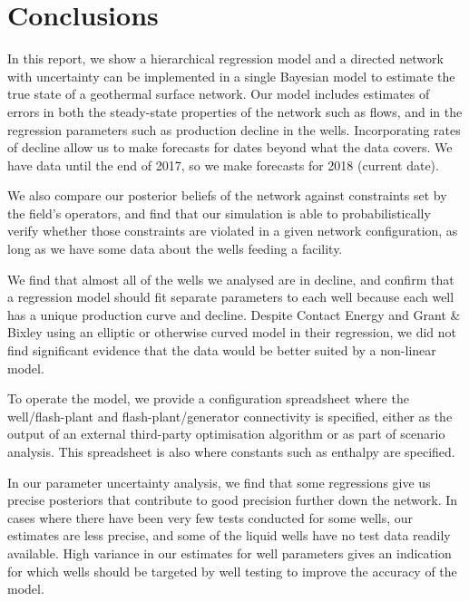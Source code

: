 \documentclass[a4paper, 12pt]{article}
\begin{document}
\section{Conclusions}
In this report, we show a hierarchical regression model and a directed network with uncertainty can be implemented in a single Bayesian model to estimate the true state of a geothermal surface network. Our model includes estimates of errors in both the steady-state properties of the network such as flows, and in the regression parameters such as production decline in the wells. Incorporating rates of decline allow us to make forecasts for dates beyond what the data covers. We have data until the end of 2017, so we make forecasts for 2018 (current date).

We also compare our posterior beliefs of the network against constraints set by the field's operators, and find that our simulation is able to probabilistically verify whether those constraints are violated in a given network configuration, as long as we have some data about the wells feeding a facility.

We find that almost all of the wells we analysed are in decline, and confirm that a regression model should fit separate parameters to each well because each well has a unique production curve and decline. Despite Contact Energy and Grant \& Bixley using an elliptic or otherwise curved model in their regression, we did not find significant evidence that the data would be better suited by a non-linear model.

To operate the model, we provide a configuration spreadsheet where the well/flash-plant and flash-plant/generator connectivity is specified, either as the output of an external third-party optimisation algorithm or as part of scenario analysis. This spreadsheet is also where constants such as enthalpy are specified.

In our parameter uncertainty analysis, we find that some regressions give us precise posteriors that contribute to good precision further down the network. In cases where there have been very few tests conducted for some wells, our estimates are less precise, and some of the liquid wells have no test data readily available. High variance in our estimates for well parameters gives an indication for which wells should be targeted by well testing to improve the accuracy of the model.

\end{document}

